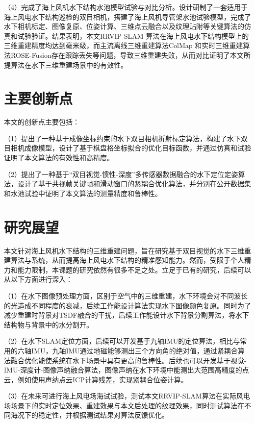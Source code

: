 （4）完成了海上风机水下结构水池模型试验与对比分析。设计研制了一套适用于海上风电水下结构巡检的双目相机，搭建了海上风机导管架水池试验模型，完成了水下相机标定、图像复原、位姿计算、三维点云融合以及纹理贴附等关键算法的仿真和试验验证。结果表明，本文RRVIP-SLAM 算法在海上风电水下结构模型上的三维重建精度均达到毫米级，而主流离线三维重建算法ColMap 和实时三维重建算法ROSE-Fusion存在跟踪丢失等问题，导致三维重建失败，从而对比证明了本文所提算法在水下三维重建场景中的有效性。

\section{主要创新点}
本文的创新点主要包括：

（1）提出了一种基于成像坐标约束的水下双目相机折射标定算法，构建了水下双目相机成像模型，设计了基于棋盘格坐标拟合的优化目标函数，并通过仿真和试验证明了本文算法的有效性和高精度。

（2）提出了一种基于“双目视觉-惯性-深度”多传感器数据融合的水下定位定姿算法，设计了基于共视帧关键帧和滑动窗口的紧耦合优化算法，并分别在公开数据集和水池试验中证明了本文算法的测量精度和鲁棒性。





\section{研究展望}

本文针对海上风机水下结构的三维重建问题，旨在研究基于双目视觉的水下三维重建算法与系统，从而提高海上风电水下结构的精准感知能力。然而，受限于个人精力和能力限制，本课题的研究依然有很多不足之处。立足于已有的研究，后续可以从以下方面进行深入：

（1）在水下图像预处理方面，区别于空气中的三维重建，水下环境会对不同波长的光造成不同程度的衰减，后续工作能设计算法实现水下图像颜色复原。同时为了减少重建时背景对TSDF融合的干扰，后续工作能设计水下背景分割算法，将水下结构物与背景中的水分割开。

（2）在水下SLAM定位方面，后续可以开发基于九轴IMU的定位算法，相比与常用的六轴IMU，九轴IMU通过地磁能够测出三个方向角的绝对值，通过紧耦合算法融合优化能使系统在水下场景中具有更高的鲁棒性。后续也可以开发基于视觉-IMU-深度计-图像声纳融合算法，图像声纳在水下环境中能测出大范围高精度的点云，例如使用声纳点云ICP计算残差，实现紧耦合位姿计算。

（3）在未来可进行海上风电场海试试验，测试本文RRVIP-SLAM算法在实际风电场场景下的实时定位效果、重建效果与本文后处理的纹理效果，同时测试算法在不同海况下的稳定性，并根据测试结果对算法反馈优化。

